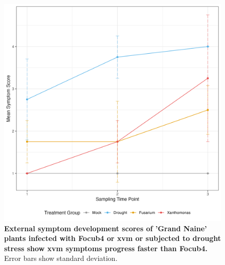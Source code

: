 \begin{figure}[h!]
    \centering
    \includegraphics[width=\textwidth]{Figures/External_plot.png}
    \captionsetup{width=\textwidth}
    \caption[External symptom development scores of 'Grand Naine' plants infected with \acl{Focub4} or \acl{xvm} or subjected to drought stress]{\textbf{External symptom development scores of 'Grand Naine' plants infected with \acf{Focub4} or \acf{xvm} or subjected to drought stress show \ac{xvm} symptoms progress faster than \ac{Focub4}.} Error bars show standard deviation.}
    \label{fig:ExternalSymptoms}
\end{figure}

